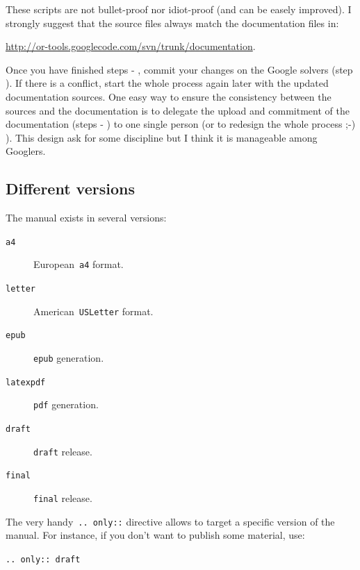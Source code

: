 \documentclass[a4paper,10pt]{article}
\newcommand{\code}[1]{\texttt{#1}}
\begin{document}
These scripts are not bullet-proof nor idiot-proof (and can be easely improved). I strongly suggest that the source files always match the documentation files in:

\begin{center}
\href{http://or-tools.googlecode.com/svn/trunk/documentation}{http://or-tools.googlecode.com/svn/trunk/documentation}.
\end{center} 

Once you have finished steps  - , commit your changes on the Google solvers (step ). If there is a conflict, start the whole process again later with the updated documentation sources. One easy way to ensure the consistency between the sources and the documentation is to delegate the upload and commitment of the documentation (steps  - ) to one single person (or to redesign the whole process ;-) ). This design ask for some discipline but I think it is manageable among Googlers.





\subsection{Different versions}
\label{manual_different_version}

The manual exists in several versions:

\begin{description}
\item[\code{a4}] European~\code{a4} format.
\item[\code{letter}] American~\code{USLetter} format.
\item[\code{epub}] \code{epub} generation.
\item[\code{latexpdf}] \code{pdf} generation.
\item[\code{draft}] \code{draft} release.
\item[\code{final}]  \code{final} release.
\end{description}

The very handy~\code{..  only::} directive allows to target a specific version of the manual. For instance, if you don't want
to publish some material, use:
\begin{center}
\code{..	only:: draft}
\end{center}
\end{document}
